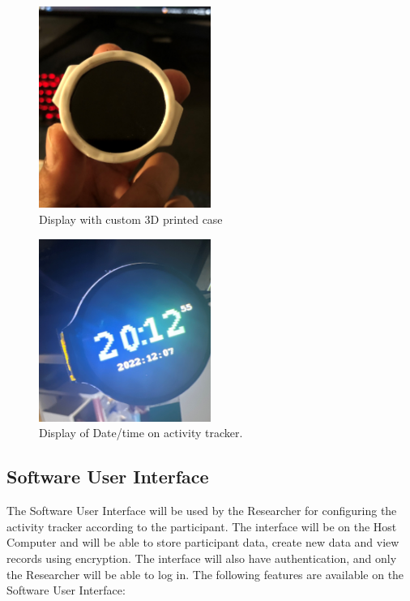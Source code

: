 \documentclass[12pt, titlepage]{article}
\begin{document}
\begin{figure}[H]
	\begin{center}
		 \includegraphics[width=0.5\textwidth]{DisplayCase}
		\caption{Display with custom 3D printed case}
		\label{DisplayCase} 
	\end{center}
\end{figure}

\begin{figure}[H]
	\begin{center}
		 \includegraphics[width=0.5\textwidth]{DisplayTime}
		\caption{Display of Date/time on activity tracker.}
		\label{DisplayTime} 
	\end{center}
\end{figure}

\subsection{Software User Interface}

The Software User Interface will be used by the Researcher for configuring the activity tracker according to the participant. The interface will be on the Host Computer and will be able to store participant data, create new data and view records using encryption. The interface will also have authentication, and only the Researcher will be able to log in. The following features are available on the Software User Interface:
\end{document}
